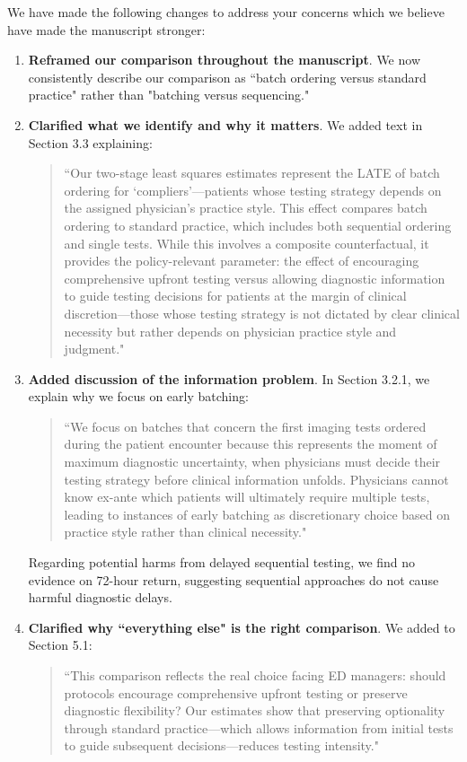 \documentclass[11pt]{article}
\newcommand{\1}{\hbox{\rm 1\kern-.35em 1}}
\begin{document}
{We have made the following changes to address your concerns which we believe have made the manuscript stronger:

\begin{enumerate}
    \item \textbf{Reframed our comparison throughout the manuscript}. We now consistently describe our comparison as ``batch ordering versus standard practice" rather than "batching versus sequencing." 
    
    \item \textbf{Clarified what we identify and why it matters}. We added text in Section 3.3 explaining:
    \begin{quote}
    ``Our two-stage least squares estimates represent the LATE of batch ordering for `compliers'---patients whose testing strategy depends on the assigned physician's practice style. This effect compares batch ordering to standard practice, which includes both sequential ordering and single tests. While this involves a composite counterfactual, it provides the policy-relevant parameter: the effect of encouraging comprehensive upfront testing versus allowing diagnostic information to guide testing decisions for patients at the margin of clinical discretion—those whose testing strategy is not dictated by clear clinical necessity but rather depends on physician practice style and judgment."
    \end{quote}
    
    \item \textbf{Added discussion of the information problem}. In Section 3.2.1, we explain why we focus on early batching:
    \begin{quote}
    ``We focus on batches that concern the first imaging tests ordered during the patient encounter because this represents the moment of maximum diagnostic uncertainty, when physicians must decide their testing strategy before clinical information unfolds. Physicians cannot know ex-ante which patients will ultimately require multiple tests, leading to instances of early batching as discretionary choice based on practice style rather than clinical necessity."
    \end{quote}

Regarding potential harms from delayed sequential testing, we find no evidence on 72-hour return, suggesting sequential approaches do not cause harmful diagnostic delays.

\item \textbf{Clarified why ``everything else" is the right comparison}. We added to Section 5.1:
\begin{quote}
    ``This comparison reflects the real choice facing ED managers: should protocols encourage comprehensive upfront testing or preserve diagnostic flexibility? Our estimates show that preserving optionality through standard practice—which allows information from initial tests to guide subsequent decisions—reduces testing intensity."
\end{quote}
\end{enumerate}

}
\end{document}
